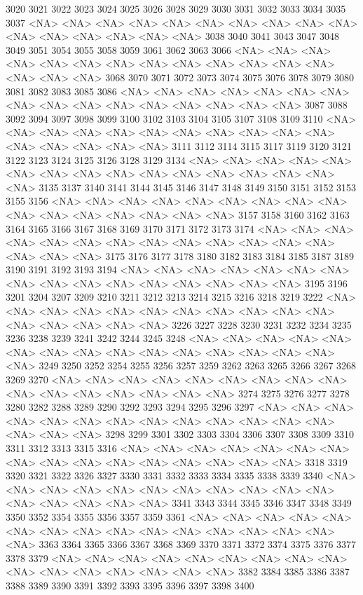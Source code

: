 \documentclass{article}
\begin{document}
\begin{Schunk}
\begin{Soutput}
3020 3021 3022 3023 3024 3025 3026 3028 3029 3030 3031 3032 3033 3034 3035 3037 
<NA> <NA> <NA> <NA> <NA> <NA> <NA> <NA> <NA> <NA> <NA> <NA> <NA> <NA> <NA> <NA> 
3038 3040 3041 3043 3047 3048 3049 3051 3054 3055 3058 3059 3061 3062 3063 3066 
<NA> <NA> <NA> <NA> <NA> <NA> <NA> <NA> <NA> <NA> <NA> <NA> <NA> <NA> <NA> <NA> 
3068 3070 3071 3072 3073 3074 3075 3076 3078 3079 3080 3081 3082 3083 3085 3086 
<NA> <NA> <NA> <NA> <NA> <NA> <NA> <NA> <NA> <NA> <NA> <NA> <NA> <NA> <NA> <NA> 
3087 3088 3092 3094 3097 3098 3099 3100 3102 3103 3104 3105 3107 3108 3109 3110 
<NA> <NA> <NA> <NA> <NA> <NA> <NA> <NA> <NA> <NA> <NA> <NA> <NA> <NA> <NA> <NA> 
3111 3112 3114 3115 3117 3119 3120 3121 3122 3123 3124 3125 3126 3128 3129 3134 
<NA> <NA> <NA> <NA> <NA> <NA> <NA> <NA> <NA> <NA> <NA> <NA> <NA> <NA> <NA> <NA> 
3135 3137 3140 3141 3144 3145 3146 3147 3148 3149 3150 3151 3152 3153 3155 3156 
<NA> <NA> <NA> <NA> <NA> <NA> <NA> <NA> <NA> <NA> <NA> <NA> <NA> <NA> <NA> <NA> 
3157 3158 3160 3162 3163 3164 3165 3166 3167 3168 3169 3170 3171 3172 3173 3174 
<NA> <NA> <NA> <NA> <NA> <NA> <NA> <NA> <NA> <NA> <NA> <NA> <NA> <NA> <NA> <NA> 
3175 3176 3177 3178 3180 3182 3183 3184 3185 3187 3189 3190 3191 3192 3193 3194 
<NA> <NA> <NA> <NA> <NA> <NA> <NA> <NA> <NA> <NA> <NA> <NA> <NA> <NA> <NA> <NA> 
3195 3196 3201 3204 3207 3209 3210 3211 3212 3213 3214 3215 3216 3218 3219 3222 
<NA> <NA> <NA> <NA> <NA> <NA> <NA> <NA> <NA> <NA> <NA> <NA> <NA> <NA> <NA> <NA> 
3226 3227 3228 3230 3231 3232 3234 3235 3236 3238 3239 3241 3242 3244 3245 3248 
<NA> <NA> <NA> <NA> <NA> <NA> <NA> <NA> <NA> <NA> <NA> <NA> <NA> <NA> <NA> <NA> 
3249 3250 3252 3254 3255 3256 3257 3259 3262 3263 3265 3266 3267 3268 3269 3270 
<NA> <NA> <NA> <NA> <NA> <NA> <NA> <NA> <NA> <NA> <NA> <NA> <NA> <NA> <NA> <NA> 
3274 3275 3276 3277 3278 3280 3282 3288 3289 3290 3292 3293 3294 3295 3296 3297 
<NA> <NA> <NA> <NA> <NA> <NA> <NA> <NA> <NA> <NA> <NA> <NA> <NA> <NA> <NA> <NA> 
3298 3299 3301 3302 3303 3304 3306 3307 3308 3309 3310 3311 3312 3313 3315 3316 
<NA> <NA> <NA> <NA> <NA> <NA> <NA> <NA> <NA> <NA> <NA> <NA> <NA> <NA> <NA> <NA> 
3318 3319 3320 3321 3322 3326 3327 3330 3331 3332 3333 3334 3335 3338 3339 3340 
<NA> <NA> <NA> <NA> <NA> <NA> <NA> <NA> <NA> <NA> <NA> <NA> <NA> <NA> <NA> <NA> 
3341 3343 3344 3345 3346 3347 3348 3349 3350 3352 3354 3355 3356 3357 3359 3361 
<NA> <NA> <NA> <NA> <NA> <NA> <NA> <NA> <NA> <NA> <NA> <NA> <NA> <NA> <NA> <NA> 
3363 3364 3365 3366 3367 3368 3369 3370 3371 3372 3374 3375 3376 3377 3378 3379 
<NA> <NA> <NA> <NA> <NA> <NA> <NA> <NA> <NA> <NA> <NA> <NA> <NA> <NA> <NA> <NA> 
3382 3384 3385 3386 3387 3388 3389 3390 3391 3392 3393 3395 3396 3397 3398 3400 

\end{Soutput}
\end{Schunk}
\end{document}
